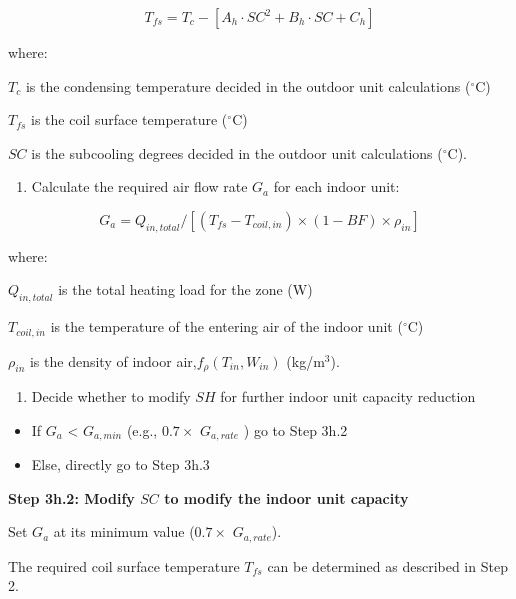\begin{equation}
T_{fs} = T_c-[A_h\cdot SC^2+B_h\cdot SC+C_h]
\end{equation}

where:

\(T_c\) is the condensing temperature decided in the outdoor unit calculations (\(^{\circ}\)C)

\(T_{fs}\) is the coil surface temperature (\(^{\circ}\)C)

\(SC\) is the subcooling degrees decided in the outdoor unit calculations (\(^{\circ}\)C).

\begin{enumerate}
\def\labelenumi{\arabic{enumi})}
\setcounter{enumi}{1}
\tightlist
\item
  Calculate the required air flow rate \(G_a\) for each indoor unit:
\end{enumerate}

\begin{equation}
G_a = Q_{in,total}/[(T_{fs}-T_{coil,in})\times{(1-BF)}\times{\rho_{in}}]
\end{equation}

where:

\(Q_{in,total}\) is the total heating load for the zone (W)

\(T_{coil,in}\) is the temperature of the entering air of the indoor unit (\(^{\circ}\)C)

\(\rho_{in}\) is the density of indoor air,\(f_{\rho}(T_{in},W_{in})\) (kg/m\(^{3}\)).

\begin{enumerate}
\def\labelenumi{\arabic{enumi})}
\setcounter{enumi}{2}
\tightlist
\item
  Decide whether to modify \(SH\) for further indoor unit capacity reduction
\end{enumerate}

\begin{itemize}
\item
  If \(G_a\) \textless{} \(G_{a,min}\) (e.g., \(0.7\times\) \(G_{a,rate}\) ) go to Step 3h.2
\item
  Else, directly go to Step 3h.3
\end{itemize}

\textbf{Step 3h.2: Modify \(SC\) to modify the indoor unit capacity}

Set \(G_a\) at its minimum value (\(0.7\times\) \(G_{a,rate}\)).

The required coil surface temperature \(T_{fs}\) can be determined as described in Step 2.

